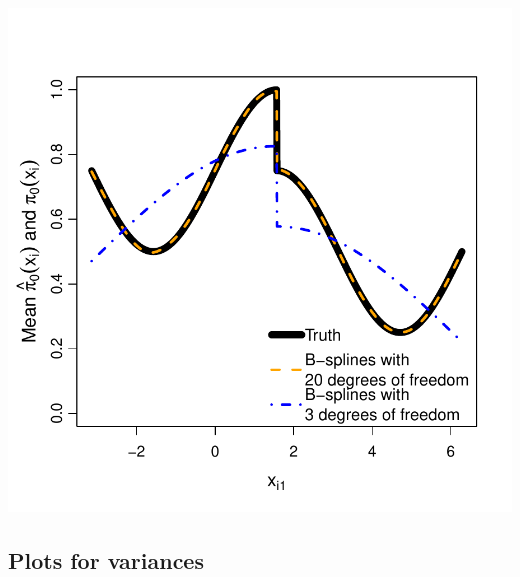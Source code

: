 \documentclass{article}\usepackage[]{graphicx}\usepackage[]{color}
\makeatletter
\def\maxwidth{ %
  \ifdim\Gin@nat@width>\linewidth
    \linewidth
  \else
    \Gin@nat@width
  \fi
}
\newenvironment{knitrout}{}{} %
\makeatother
\begin{document}
\begin{knitrout}
{\centering \includegraphics[width=\maxwidth]{figures/Fig1c-1} 

}



\end{knitrout}

\subsection{Plots for variances}
\end{document}
